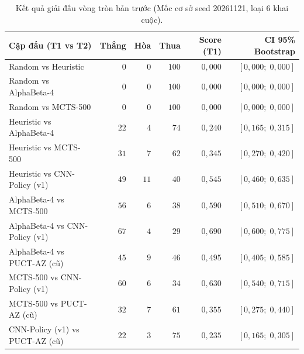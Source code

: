 \documentclass[11pt, a4paper]{article}
\begin{document}
\begin{table}[H]
    \centering
    \small
    \caption{Kết quả giải đấu vòng tròn bản trước (Mốc cơ sở seed 20261121, loại 6 khai cuộc).}
    \label{tab:appendix_old_rr}
    \begin{tabular}{@{} l r r r r r @{}}
        \toprule
        \textbf{Cặp đấu (T1 vs T2)} & \textbf{Thắng} & \textbf{Hòa} & \textbf{Thua} & \textbf{Score (T1)} & \textbf{CI 95\% Bootstrap} \\
        \midrule
        Random vs Heuristic & $0$ & $0$ & $100$ & $0{,}000$ & $[0{,}000;\; 0{,}000]$ \\
        Random vs AlphaBeta-4 & $0$ & $0$ & $100$ & $0{,}000$ & $[0{,}000;\; 0{,}000]$ \\
        Random vs MCTS-500 & $0$ & $0$ & $100$ & $0{,}000$ & $[0{,}000;\; 0{,}000]$ \\
        Heuristic vs AlphaBeta-4 & $22$ & $4$ & $74$ & $0{,}240$ & $[0{,}165;\; 0{,}315]$ \\
        Heuristic vs MCTS-500 & $31$ & $7$ & $62$ & $0{,}345$ & $[0{,}270;\; 0{,}420]$ \\
        Heuristic vs CNN-Policy (v1) & $49$ & $11$ & $40$ & $0{,}545$ & $[0{,}460;\; 0{,}635]$ \\
        AlphaBeta-4 vs MCTS-500 & $56$ & $6$ & $38$ & $0{,}590$ & $[0{,}510;\; 0{,}670]$ \\
        AlphaBeta-4 vs CNN-Policy (v1) & $67$ & $4$ & $29$ & $0{,}690$ & $[0{,}600;\; 0{,}775]$ \\
        AlphaBeta-4 vs PUCT-AZ (cũ) & $45$ & $9$ & $46$ & $0{,}495$ & $[0{,}405;\; 0{,}585]$ \\
        MCTS-500 vs CNN-Policy (v1) & $60$ & $6$ & $34$ & $0{,}630$ & $[0{,}540;\; 0{,}715]$ \\
        MCTS-500 vs PUCT-AZ (cũ) & $32$ & $7$ & $61$ & $0{,}355$ & $[0{,}275;\; 0{,}440]$ \\
        CNN-Policy (v1) vs PUCT-AZ (cũ) & $22$ & $3$ & $75$ & $0{,}235$ & $[0{,}165;\; 0{,}305]$ \\
        \bottomrule
    \end{tabular}
\end{table}
\end{document}
